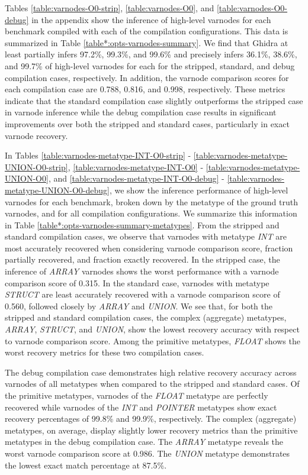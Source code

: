 \documentclass[conference]{IEEEtran}
\begin{document}


Tables \ref{table:varnodes-O0-strip}, \ref{table:varnodes-O0}, and \ref{table:varnodes-O0-debug} in the appendix show the inference of high-level varnodes for each benchmark compiled with each of the compilation configurations. This data is summarized in Table \ref{table*:opts-varnodes-summary}. We find that Ghidra at least partially infers 97.2\%, 99.3\%, and 99.6\% and precisely infers 36.1\%, 38.6\%, and 99.7\% of high-level varnodes for each for the stripped, standard, and debug compilation cases, respectively. In addition, the varnode comparison scores for each compilation case are 0.788, 0.816, and 0.998, respectively. These metrics indicate that the standard compilation case slightly outperforms the stripped case in varnode inference while the debug compilation case results in significant improvements over both the stripped and standard cases, particularly in exact varnode recovery.



In Tables \ref{table:varnodes-metatype-INT-O0-strip} - \ref{table:varnodes-metatype-UNION-O0-strip}, \ref{table:varnodes-metatype-INT-O0} - \ref{table:varnodes-metatype-UNION-O0}, and \ref{table:varnodes-metatype-INT-O0-debug} - \ref{table:varnodes-metatype-UNION-O0-debug}, we show the inference performance of high-level varnodes for each benchmark, broken down by the metatype of the ground truth varnodes, and for all compilation configurations. We summarize this information in Table \ref{table*:opts-varnodes-summary-metatypes}. From the stripped and standard compilation cases, we observe that varnodes with metatype \emph{INT} are most accurately recovered when considering varnode comparison score, fraction partially recovered, and fraction exactly recovered. In the stripped case, the inference of \emph{ARRAY} varnodes shows the worst performance with a varnode comparison score of 0.315. In the standard case, varnodes with metatype \emph{STRUCT} are least accurately recovered with a varnode comparison score of 0.560, followed closely by \emph{ARRAY} and \emph{UNION}. We see that, for both the stripped and standard compilation cases, the complex (aggregate) metatypes, \emph{ARRAY}, \emph{STRUCT}, and \emph{UNION}, show the lowest recovery accuracy with respect to varnode comparison score. Among the primitive metatypes, \emph{FLOAT} shows the worst recovery metrics for these two compilation cases.

The debug compilation case demonstrates high relative recovery accuracy across varnodes of all metatypes when compared to the stripped and standard cases. Of the primitive metatypes, varnodes of the \emph{FLOAT} metatype are perfectly recovered while varnodes of the \emph{INT} and \emph{POINTER} metatypes show exact recovery percentages of 99.8\% and 99.9\%, respectively. The complex (aggregate) metatypes, on average, display slightly lower recovery metrics than the primitive metatypes in the debug compilation case. The \emph{ARRAY} metatype reveals the worst varnode comparison score at 0.986. The \emph{UNION} metatype demonstrates the lowest exact match percentage at 87.5\%.
\end{document}
